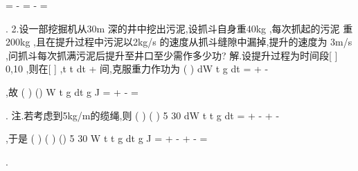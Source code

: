 =
-
\cdots 
\cdots 
=
-
=




\int 
\int 
. 
2.设一部挖掘机从30m 深的井中挖出污泥,设抓斗自身重40kg ,每次抓起的污泥 
重200kg ,且在提升过程中污泥以2kg/s 的速度从抓斗缝隙中漏掉,提升的速度为 
3m/s ,问抓斗每次抓满污泥后提升至井口至少需作多少功? 
解.设提升过程为时间段[
]
0,10 ,则在[
]
,t t
dt
+
间,克服重力作功为 
(
)
dW
t
g
dt
=
+
-
\cdots 




,故
(
)
()
W
t
g
dt
g J
=
+
-
\cdots 
=




\int 
. 
\textcolor{lyred}{注}.若考虑到5kg/m的缆绳,则
(
)
(
)
5 30
dW
t
t
g
dt
=
+
-
+
-
\cdots 




,于是 
(
)
(
)
()
5 30
W
t
t
g
dt
g J
=
+
-
+
-
\cdots 
=




\int 
. 